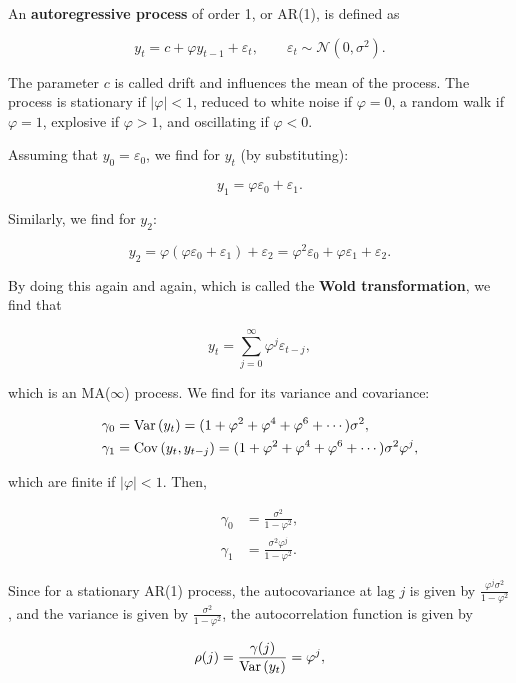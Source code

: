 An \textbf{autoregressive process} of order 1, or AR(1), is defined as

\begin{equation}
  y_t = c + \varphi y_{t-1} + \varepsilon_t,\qquad \varepsilon_t\sim\mathcal{N}(0,\sigma^2).
\end{equation}

The parameter $c$ is called drift and influences the mean of the process. The process is stationary if $|\varphi|<1$, reduced to white noise if $\varphi = 0$, a random walk if $\varphi = 1$, explosive if $\varphi > 1$, and oscillating if $\varphi < 0$. 

Assuming that $y_0 = \varepsilon_0$, we find for $y_t$ (by substituting):

\[
	y_1 = \varphi \varepsilon_0 + \varepsilon_1.
\]

Similarly, we find for $y_2$:

\[
	y_2 = \varphi(\varphi \varepsilon_0 + \varepsilon_1) + \varepsilon_2 = \varphi^2\varepsilon_0 + \varphi\varepsilon_1 + \varepsilon_2.
\]

By doing this again and again, which is called the \textbf{Wold transformation}, we find that

\begin{equation}
	y_t = \sum^\infty_{j=0}\varphi^j\varepsilon_{t-j},
\end{equation}

which is an MA($\infty$) process. We find for its variance and covariance:

\begin{align*}
	\gamma_0 &= \mathrm{Var}\left({y_t}\right) = (1 + \varphi^2 + \varphi^4 + \varphi^6 + \cdots)\sigma^2, \\
	\gamma_1 &= \mathrm{Cov}\left({y_t, y_{t-j}}\right) = (1 + \varphi^2 + \varphi^4 + \varphi^6 + \cdots) \sigma^2\varphi^j,
\end{align*}

which are finite if $|\varphi| < 1$. Then, 

\begin{align*}
	\gamma_0 &= \frac{\sigma^2}{1-\varphi^2}, \\
	\gamma_1 &= \frac{\sigma^2\varphi^j}{1-\varphi^2}.
\end{align*}

Since for a stationary AR(1) process, the autocovariance at lag $j$ is given by $\frac{\varphi^j\sigma^2}{1-\varphi^2}$, and the variance is given by $\frac{\sigma^2}{1-\varphi^2}$, the autocorrelation function is given by

\begin{equation}
	\rho(j) = \frac{\gamma(j)}{\mathrm{Var}\left({y_t}\right)} = \varphi^j,
\end{equation}

